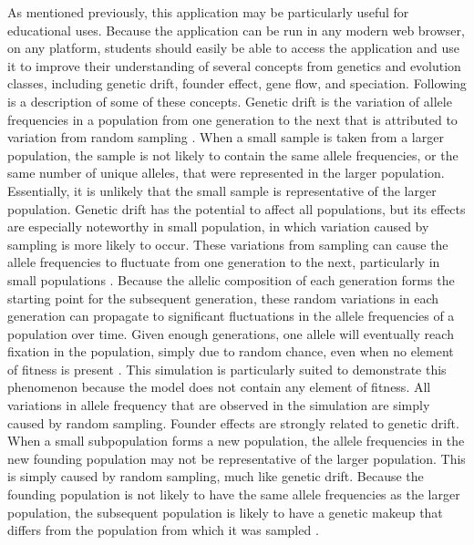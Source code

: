 \documentclass[12pt]{article}
\begin{document}
\begin{spacing}{1.5}
As mentioned previously, this application may be particularly useful for educational uses. Because the application can be run in any modern web browser, on any platform, students should easily be able to access the application and use it to improve their understanding of several concepts from genetics and evolution classes, including genetic drift, founder effect, gene flow, and speciation. Following is a description of some of these concepts.\newline
\newline
Genetic drift is the variation of allele frequencies in a population from one generation to the next that is attributed to variation from random sampling \cite{evolution}. When a small sample is taken from a larger population, the sample is not likely to contain the same allele frequencies, or the same number of unique alleles, that were represented in the larger population. Essentially, it is unlikely that the small sample is representative of the larger population. Genetic drift has the potential to affect all populations, but its effects are especially noteworthy in small population, in which variation caused by sampling is more likely to occur. These variations from sampling can cause the allele frequencies to fluctuate from one generation to the next, particularly in small populations \cite{evolution}. Because the allelic composition of each generation forms the starting point for the subsequent generation, these random variations in each generation can propagate to significant fluctuations in the allele frequencies of a population over time. Given enough generations, one allele will eventually reach fixation in the population, simply due to random chance, even when no element of fitness is present \cite{evolution}. This simulation is particularly suited to demonstrate this phenomenon because the model does not contain any element of fitness. All variations in allele frequency that are observed in the simulation are simply caused by random sampling.\newline
\newline
Founder effects are strongly related to genetic drift. When a small subpopulation forms a new population, the allele frequencies in the new founding population may not be representative of the larger population. This is simply caused by random sampling, much like genetic drift. Because the founding population is not likely to have the same allele frequencies as the larger population, the subsequent population is likely to have a genetic makeup that differs from the population from which it was sampled \cite{genAnalysis}.\newline

\end{spacing}
\end{document}
